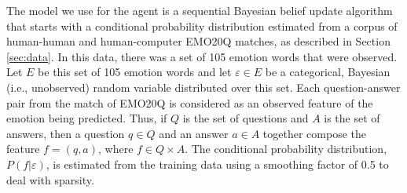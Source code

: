 \documentclass[a4paper]{article}
\begin{document}


The model we use for the agent is a sequential Bayesian belief update
algorithm that starts with a conditional probability distribution estimated
from a corpus of human-human and human-computer EMO20Q matches, as described
in Section \ref{sec:data}. In this data, there was a set of 105 emotion words
that were observed.  Let $E$ be this set of 105 emotion words and let
$\varepsilon \in E$ be a categorical, Bayesian (i.e., unobserved) random
variable distributed over this set. Each question-answer pair from the match
of EMO20Q is considered as an observed feature of the emotion being predicted.
Thus, if $Q$ is the set of questions and $A$ is the set of answers, then a
question $q \in Q$ and an answer $a \in A$ together compose the feature
$f=(q,a)$, where $f \in Q \times A$. The conditional probability distribution,
$P(f|\varepsilon)$, is estimated from the training data using a smoothing
factor of 0.5 to deal with sparsity.

\end{document}

